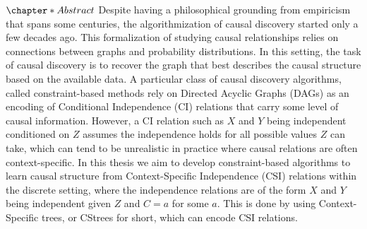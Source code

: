 \documentclass{tufte-book}
\author{nazaal}
\date{\today}
\title{}
\begin{document}
\setlength\parindent{0pt}
\setcounter{secnumdepth}{2}
\newcommand{\indep}{\perp \!\!\! \perp}

\let\cleardoublepage\clearpage

\(\chapter*{Abstract}\)
Despite having a philosophical grounding from empiricism that spans some centuries, the algorithmization of causal discovery started only a few decades ago. This formalization of studying causal relationships relies on connections between graphs and probability distributions. In this setting, the task of causal discovery is to recover the graph that best describes the causal structure based on the available data. A particular class of causal discovery algorithms, called constraint-based methods rely on Directed Acyclic Graphs (DAGs) as an encoding of Conditional Independence (CI) relations that carry some level of causal information. However, a CI relation such as \(X\) and \(Y\) being independent conditioned on \(Z\) assumes the independence holds for all possible values \(Z\) can take, which can tend to be unrealistic in practice where causal relations are often context-specific.  In this thesis we aim to develop constraint-based algorithms to learn causal structure from Context-Specific Independence (CSI) relations within the discrete setting, where the independence relations are of the form \(X\) and \(Y\) being independent given \(Z\) and \(C=a\) for some \(a\). This is done by using Context-Specific trees, or CStrees for short, which can encode CSI relations.
\end{document}

